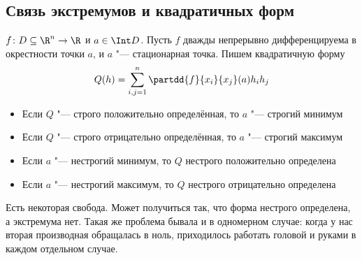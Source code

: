 \subsection{Связь экстремумов и квадратичных форм}
\begin{theorem}
	$f \colon D \subseteq \R^n \to \R$ и $a \in \Int D$.
	Пусть $f$ дважды непрерывно дифференцируема в окрестности точки $a$, и $a$ "--- стационарная точка.
	Пишем квадратичную форму
	\[
		Q(h) = \sum_{i,j=1}^n \partdd{f}{x_i}{x_j} (a) h_i h_j
	\]
	\begin{itemize}
	\item Если $Q$ "--- строго положительно определённая, то $a$ "--- строгий минимум
	\item Если $Q$ "--- строго отрицательно определённая, то $a$ "--- строгий максимум
	\item Если $a$ "--- нестрогий минимум, то $Q$ нестрого положительно определена
	\item Если $a$ "--- нестрогий максимум, то $Q$ нестрого отрицательно определена
	\end{itemize}
\end{theorem}
\begin{Rem}
	Есть некоторая свобода.
	Может получиться так, что форма нестрого определена, а экстремума нет.
	Такая же проблема бывала и в одномерном случае: когда у нас вторая производная обращалась в ноль,
	приходилось работать головой и руками в каждом отдельном случае.
\end{Rem}
